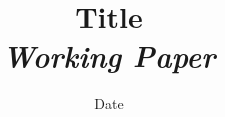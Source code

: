 


\title{Title\bigskip\\
\textit{Working Paper}
}
\author{}
\date{Date}


\maketitle

\justify


\begin{abstract}

\end{abstract}






















